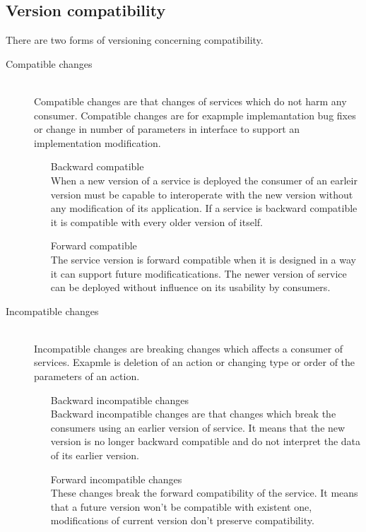 \subsection{Version compatibility}
There are two forms of versioning concerning compatibility. \cite{website:service-versioning}
\begin{description}
  \item[Compatible changes] \hfill \\
  Compatible changes are that changes of services which do not harm any consumer. Compatible changes are  for exapmple implemantation bug fixes or change in number of parameters in interface to support an implementation modification.
  \begin{enumerate}
    \item[Backward compatible] \hfill \\ 
  When a new version of a service is deployed the consumer of an earleir version must be capable to interoperate with the new version without any modification of its application. If a service is backward compatible it is compatible with every older version of itself.
  \item[Forward compatible] \hfill \\
  The service version is forward compatible when it is designed in a way it can support future modificatications. The newer version of service can be deployed without influence on its usability by consumers. 
  \end{enumerate}
  
  \item[Incompatible changes] \hfill \\
  Incompatible changes are breaking changes which affects a consumer of services. Exapmle is deletion of an action or changing type or order of the parameters of an action.
  \begin{enumerate} 
    \item[Backward incompatible changes]  \hfill \\
    Backward incompatible changes are that changes which break the consumers using an earlier version of service. It means that the new version is no longer backward compatible and do not interpret the data of its earlier version.
    \item[Forward incompatible changes] \hfill \\
    These changes break the forward compatibility of the service. It means that a future version won't be compatible with existent one, modifications of current version don't preserve compatibility.
  \end{enumerate}
\end{description}


